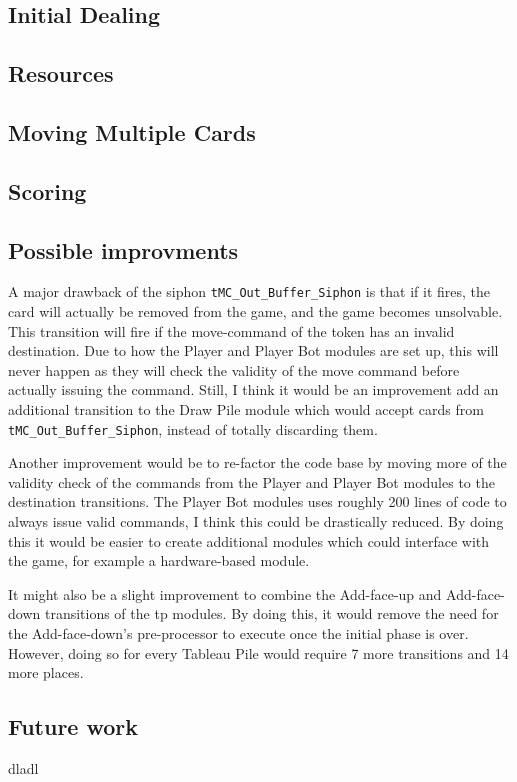 \documentclass[runningheads,a4paper]{llncs}
\begin{document}
\subsection{Initial Dealing}
\subsection{Resources}
\label{sec:3_Resources}
\subsection{Moving Multiple Cards}
\subsection{Scoring}
\subsection{Possible improvments}
A major drawback of the siphon \verb!tMC_Out_Buffer_Siphon! is that if it fires, the card will actually be removed from the game, and the game becomes unsolvable. This transition will fire if the move-command of the token has an invalid destination. Due to how the Player and Player Bot modules are set up, this will never happen as they will check the validity of the move command before actually issuing the command. Still, I think it would be an improvement add an additional transition to the Draw Pile module which would accept cards from \verb!tMC_Out_Buffer_Siphon!, instead of totally discarding them.
\newline

Another improvement would be to re-factor the code base by moving more of the validity check of the commands from the Player and Player Bot modules to the destination transitions. The Player Bot modules uses roughly 200 lines of code to always issue valid commands, I think this could be drastically reduced. By doing this it would be easier to create additional modules which could interface with the game, for example a hardware-based module.
\newline

It might also be a slight improvement to combine the Add-face-up and Add-face-down transitions of the \ac{tp} modules. By doing this, it would remove the need for the Add-face-down's pre-processor to execute once the initial phase is over. However, doing so for every Tableau Pile would require 7 more transitions and 14 more places. 
\clearpage
\subsection{Future work}
dladl
\end{document}
